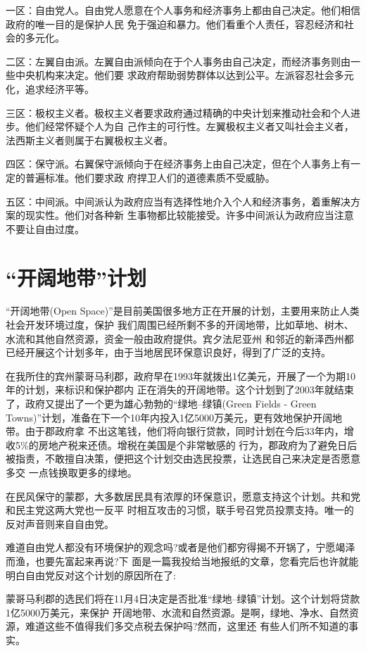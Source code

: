 ﻿\documentclass[11pt]{article}
\begin{document}
一区：自由党人。自由党人愿意在个人事务和经济事务上都由自己决定。他们相信政府的唯一目的是保护人民
免于强迫和暴力。他们看重个人责任，容忍经济和社会的多元化。

二区：左翼自由派。左翼自由派倾向在于个人事务由自己决定，而经济事务则由一些中央机构来决定。他们要
求政府帮助弱势群体以达到公平。左派容忍社会多元化，追求经济平等。

三区：极权主义者。极权主义者要求政府通过精确的中央计划来推动社会和个人进步。他们经常怀疑个人为自
己作主的可行性。左翼极权主义者又叫社会主义者，法西斯主义者则属于右翼极权主义者。

四区：保守派。右翼保守派倾向于在经济事务上由自己决定，但在个人事务上有一定的普遍标准。他们要求政
府捍卫人们的道德素质不受威胁。

五区：中间派。中间派认为政府应当有选择性地介入个人和经济事务，着重解决方案的现实性。他们对各种新
生事物都比较能接受。许多中间派认为政府应当注意不要让自由过度。

\section{``开阔地带''计划}

``开阔地带(Open Space)''是目前美国很多地方正在开展的计划，主要用来防止人类社会开发环境过度，保护
我们周围已经所剩不多的开阔地带，比如草地、树木、水流和其他自然资源，资金一般由政府提供。宾夕法尼亚州
和邻近的新泽西州都已经开展这个计划多年，由于当地居民环保意识良好，得到了广泛的支持。

在我所住的宾州蒙哥马利郡，政府早在1993年就拨出1亿美元，开展了一个为期10年的计划，来标识和保护郡内
正在消失的开阔地带。这个计划到了2003年就结束了，政府又提出了一个更为雄心勃勃的``绿地--绿镇(Green
Fields - Green Towns)''计划，准备在下一个10年内投入1亿5000万美元，更有效地保护开阔地带。由于郡政府拿
不出这笔钱，他们将向银行贷款，同时计划在今后33年内，增收5\%的房地产税来还债。增税在美国是个非常敏感的
行为，郡政府为了避免日后被指责，不敢擅自决策，便把这个计划交由选民投票，让选民自己来决定是否愿意多交
一点钱换取更多的绿地。

在民风保守的蒙郡，大多数居民具有浓厚的环保意识，愿意支持这个计划。共和党和民主党这两大党也一反平
时相互攻击的习惯，联手号召党员投票支持。唯一的反对声音则来自自由党。

难道自由党人都没有环境保护的观念吗?或者是他们都穷得揭不开锅了，宁愿竭泽而渔，也要先富起来再说?下
面是一篇我投给当地报纸的文章，您看完后也许就能明白自由党反对这个计划的原因所在了:

蒙哥马利郡的选民们将在11月4日决定是否批准``绿地--绿镇''计划。这个计划将贷款1亿5000万美元，来保护
开阔地带、水流和自然资源。是啊，绿地、净水、自然资源，难道这些不值得我们多交点税去保护吗?然而，这里还
有些人们所不知道的事实。
\end{document}
